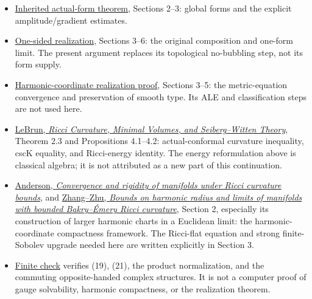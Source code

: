 \documentclass[
  11pt,
]{article}
\providecommand{\tightlist}{%
  \setlength{\itemsep}{0pt}\setlength{\parskip}{0pt}}
\begin{document}
\begin{itemize}
\tightlist
\item
  \href{../mathematics/current/line1_composed_application.md}{Inherited
  actual-form theorem}, Sections 2--3: global forms and the explicit
  amplitude/gradient estimates.
\item
  \href{20260923_gauge_saturation_ke.md}{One-sided realization},
  Sections 3--6: the original composition and one-form limit. The
  present argument replaces its topological no-bubbling step, not its
  form supply.
\item
  \href{20260923_compact_realization.md}{Harmonic-coordinate realization
  proof}, Sections 3--5: the metric-equation convergence and
  preservation of smooth type. Its ALE and classification steps are not
  used here.
\item
  \href{https://arxiv.org/html/math/0003068}{LeBrun, \emph{Ricci
  Curvature, Minimal Volumes, and Seiberg--Witten Theory}}, Theorem 2.3
  and Propositions 4.1--4.2: actual-conformal curvature inequality, cscK
  equality, and Ricci-energy identity. The energy reformulation above is
  classical algebra; it is not attributed as a new part of this
  continuation.
\item
  \href{https://doi.org/10.1007/BF01233434}{Anderson, \emph{Convergence
  and rigidity of manifolds under Ricci curvature bounds}}, and
  \href{https://arxiv.org/html/1705.10071}{Zhang--Zhu, \emph{Bounds on
  harmonic radius and limits of manifolds with bounded Bakry--Émery
  Ricci curvature}}, Section 2, especially its construction of larger
  harmonic charts in a Euclidean limit: the harmonic-coordinate
  compactness framework. The Ricci-flat equation and strong
  finite-Sobolev upgrade needed here are written explicitly in Section
  3.
\item
  \href{check_bilateral_realization.py}{Finite check} verifies (19),
  (21), the product normalization, and the commuting opposite-handed
  complex structures. It is not a computer proof of gauge solvability,
  harmonic compactness, or the realization theorem.
\end{itemize}
\end{document}
